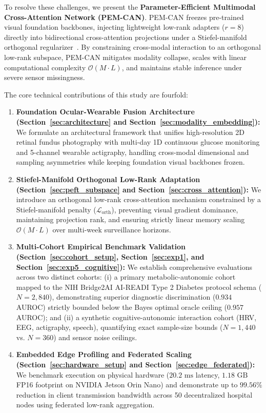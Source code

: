 \documentclass[journal,10pt,twocolumn]{IEEEtran}
\begin{document}
To resolve these challenges, we present the \textbf{Parameter-Efficient Multimodal Cross-Attention Network (PEM-CAN)}. PEM-CAN freezes pre-trained visual foundation backbones, injecting lightweight low-rank adapters ($r=8$) directly into bidirectional cross-attention projections under a Stiefel-manifold orthogonal regularizer~\cite{hu2022lora,edelman1998geometry}. By constraining cross-modal interaction to an orthogonal low-rank subspace, PEM-CAN mitigates modality collapse, scales with linear computational complexity $\mathcal{O}(M \cdot L)$, and maintains stable inference under severe sensor missingness.

The core technical contributions of this study are fourfold:
\begin{enumerate}
    \item \textbf{Foundation Ocular-Wearable Fusion Architecture (Section~\ref{sec:architecture} and Section~\ref{sec:modality_embedding}):} We formulate an architectural framework that unifies high-resolution 2D retinal fundus photography with multi-day 1D continuous glucose monitoring and 5-channel wearable actigraphy, handling cross-modal dimensional and sampling asymmetries while keeping foundation visual backbones frozen.
    \item \textbf{Stiefel-Manifold Orthogonal Low-Rank Adaptation (Section~\ref{sec:peft_subspace} and Section~\ref{sec:cross_attention}):} We introduce an orthogonal low-rank cross-attention mechanism constrained by a Stiefel-manifold penalty ($\mathcal{L}_{\text{orth}}$), preventing visual gradient dominance, maintaining projection rank, and ensuring strictly linear memory scaling $\mathcal{O}(M \cdot L)$ over multi-week surveillance horizons.
    \item \textbf{Multi-Cohort Empirical Benchmark Validation (Section~\ref{sec:cohort_setup}, Section~\ref{sec:exp1}, and Section~\ref{sec:exp5_cognitive}):} We establish comprehensive evaluations across two distinct cohorts: (i) a primary metabolic-autonomic cohort mapped to the NIH Bridge2AI AI-READI Type 2 Diabetes protocol schema ($N=2{,}840$), demonstrating superior diagnostic discrimination ($0.934$ AUROC) strictly bounded below the Bayes optimal oracle ceiling ($0.957$ AUROC); and (ii) a synthetic cognitive-autonomic interaction cohort (HRV, EEG, actigraphy, speech), quantifying exact sample-size bounds ($N=1{,}440$ vs. $N=360$) and sensor noise ceilings.
    \item \textbf{Embedded Edge Profiling and Federated Scaling (Section~\ref{sec:hardware_setup} and Section~\ref{sec:edge_federated}):} We benchmark execution on physical hardware ($20.2\text{ ms}$ latency, $1.18\text{ GB}$ FP16 footprint on NVIDIA Jetson Orin Nano) and demonstrate up to $99.56\%$ reduction in client transmission bandwidth across 50 decentralized hospital nodes using federated low-rank aggregation.
\end{enumerate}
\end{document}
